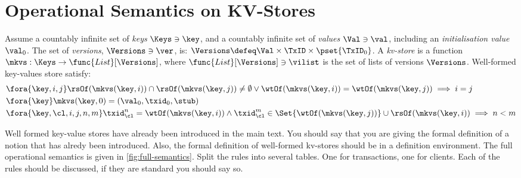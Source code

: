 \section{Operational Semantics on KV-Stores}
\label{sec:full-semantics}

\begin{definition}
\label{def:mkvs-appendix}
Assume a countably infinite set of \emph{keys} $\Keys \ni \key$, 
and a countably infinite set of  \emph{values} $\Val \ni \val$, 
including an \emph{initialisation value} $\val_0 $.
The set of \emph{versions}, $\Versions \ni \ver$, is: $\Versions \defeq \Val \times \TxID \times \pset{\TxID_{0}}$. 
A \emph{kv-store} is a function $\mkvs: \Keys \to \func{List}[\Versions]$, 
where $\func{List}[\Versions] \ni \vilist$ is the set of lists of versions $\Versions$. 
Well-formed key-values store satisfy:
\begin{align}
& \fora{\key, i, j} 
\rsOf(\mkvs(\key, i)) \cap \rsOf(\mkvs(\key, j)) \neq \emptyset \lor
\wtOf(\mkvs(\key, i)) = \wtOf(\mkvs(\key, j))
\implies i = j  \\
& \fora{\key} \mkvs(\key, 0) = (\val_0, \txid_0, \stub) \\
& \fora{ \key, \cl, i,j, n, m} 
\txid_{\cl}^{n} = \wtOf(\mkvs(\key,i)) \land \txid_{\cl}^{m} \in
\Set{\wtOf(\mkvs(\key,j))} \cup \rsOf(\mkvs(\key, i)) \implies n < m
\end{align}
\end{definition}
\ac{Well formed key-value stores have already been introduced in the main text. 
You should say that you are giving the formal definition of a notion that has alredy been 
introduced. Also, the formal definition of well-formed kv-stores should be in a definition environment.}
The full operational semantics is given in \cref{fig:full-semantics}.
\ac{Split the rules into several tables. One for transactions, one for clients. 
Each of the rules should be discussed, if they are standard you should say so.}


%
